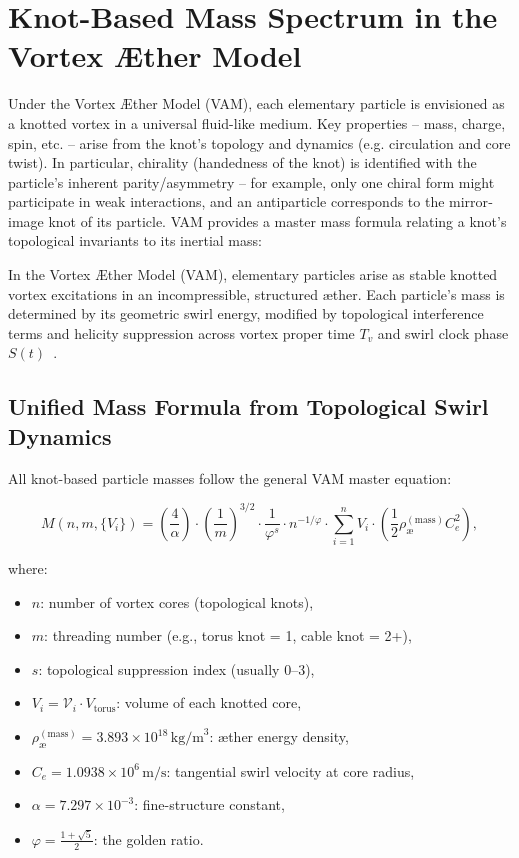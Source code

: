 
\section{Knot-Based Mass Spectrum in the Vortex \AE{}ther Model}
\label{sec:knot_particle_mapping}

Under the Vortex Æther Model (VAM), each elementary particle is envisioned as a knotted vortex in a universal fluid-like medium. Key properties – mass, charge, spin, etc. – arise from the knot’s topology and dynamics (e.g. circulation and core twist). In particular, chirality (handedness of the knot) is identified with the particle’s inherent parity/asymmetry – for example, only one chiral form might participate in weak interactions, and an antiparticle corresponds to the mirror‐image knot of its particle. VAM provides a master mass formula relating a knot’s topological invariants to its inertial mass:

In the Vortex \AE{}ther Model (VAM), elementary particles arise as stable knotted vortex excitations in an incompressible, structured æther. Each particle's mass is determined by its geometric swirl energy, modified by topological interference terms and helicity suppression across vortex proper time \(T_v\) and swirl clock phase \(S(t)\)~\cite{Iskandarani2025StandardModel,Iskandarani2025Timedilation}.

\subsection{Unified Mass Formula from Topological Swirl Dynamics}

All knot-based particle masses follow the general VAM master equation:

\begin{equation}
M(n, m, \{V_i\}) = \left( \frac{4}{\alpha} \right) \cdot \left( \frac{1}{m} \right)^{3/2} \cdot \frac{1}{\varphi^s} \cdot n^{-1/\varphi} \cdot \sum_{i=1}^{n} V_i \cdot \left( \frac{1}{2} \rho_\text{\ae}^{(\text{mass})} C_e^2 \right),
\label{eq:mass_master}
\end{equation}

where:
\begin{itemize}
  \item \(n\): number of vortex cores (topological knots),
  \item \(m\): threading number (e.g., torus knot = 1, cable knot = 2+),
  \item \(s\): topological suppression index (usually 0–3),
  \item \(V_i = \mathcal{V}_i \cdot V_{\text{torus}}\): volume of each knotted core,
  \item \(\rho_\text{\ae}^{(\text{mass})} = 3.893 \times 10^{18}\,\text{kg/m}^3\): æther energy density,
  \item \(C_e = 1.0938 \times 10^6\,\text{m/s}\): tangential swirl velocity at core radius,
  \item \(\alpha = 7.297\times 10^{-3}\): fine-structure constant,
  \item \(\varphi = \frac{1+\sqrt{5}}{2}\): the golden ratio.
\end{itemize}

